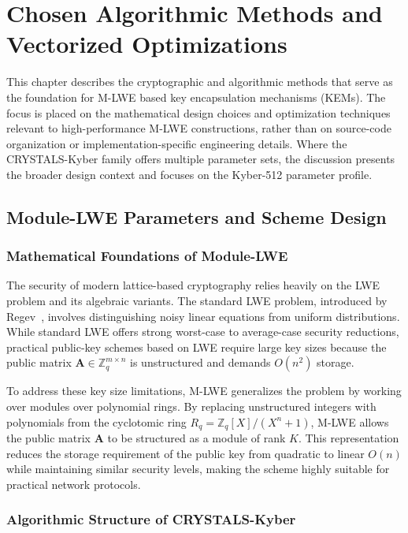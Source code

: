 \chapter{Chosen Algorithmic Methods and Vectorized Optimizations}
\label{ch:chosen_methods}

This chapter describes the cryptographic and algorithmic methods that serve as the foundation for M-LWE based key encapsulation mechanisms (KEMs). The focus is placed on the mathematical design choices and optimization techniques relevant to high-performance M-LWE constructions, rather than on source-code organization or implementation-specific engineering details. Where the CRYSTALS-Kyber family offers multiple parameter sets, the discussion presents the broader design context and focuses on the Kyber-512 parameter profile.

\section{Module-LWE Parameters and Scheme Design}
\label{sec:mlwe_parameters_design}

\subsection{Mathematical Foundations of Module-LWE}
\label{sub:mlwe_mathematical_foundations}

The security of modern lattice-based cryptography relies heavily on the LWE problem and its algebraic variants. The standard LWE problem, introduced by Regev~\cite{regev2005lattices}, involves distinguishing noisy linear equations from uniform distributions. While standard LWE offers strong worst-case to average-case security reductions, practical public-key schemes based on LWE require large key sizes because the public matrix $\mathbf{A} \in \mathbb{Z}_q^{m \times n}$ is unstructured and demands $O(n^2)$ storage.

To address these key size limitations, M-LWE generalizes the problem by working over modules over polynomial rings. By replacing unstructured integers with polynomials from the cyclotomic ring $R_q = \mathbb{Z}_q[X]/(X^n + 1)$, M-LWE allows the public matrix $\mathbf{A}$ to be structured as a module of rank $K$. This representation reduces the storage requirement of the public key from quadratic to linear $O(n)$ while maintaining similar security levels, making the scheme highly suitable for practical network protocols.

\subsection{Algorithmic Structure of CRYSTALS-Kyber}
\label{sub:crystals_kyber_structure}

